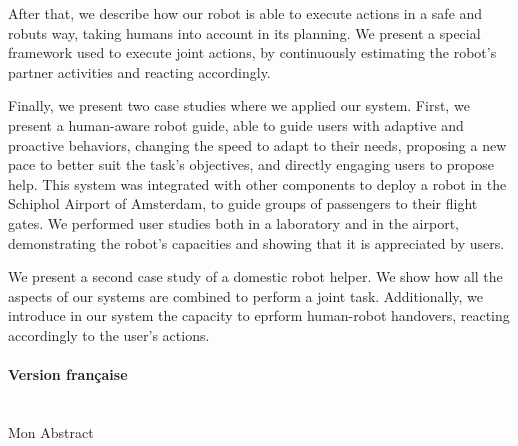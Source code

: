 \documentclass[11pt, oneside]{Thesis} %
\begin{document}
{After that, we describe how our robot is able to execute actions in a safe and robuts way, taking humans into account in its planning. We present a special framework used to execute joint actions, by continuously estimating the robot's partner activities and reacting accordingly.

Finally, we present two case studies where we applied our system. First, we present a human-aware robot guide, able to guide users with adaptive and proactive behaviors, changing the speed to adapt to their needs, proposing a new pace to better suit the task's objectives, and directly engaging users to propose help. This system was integrated with other components to deploy a robot in the Schiphol Airport of Amsterdam, to guide groups of passengers to their flight gates. We performed user studies both in a laboratory and in the airport, demonstrating the robot's capacities and showing that it is appreciated by users. 

We present a second case study of a domestic robot helper. We show how all the aspects of our systems are combined to perform a joint task. Additionally, we introduce in our system the capacity to eprform human-robot handovers, reacting accordingly to the user's actions.

\paragraph{Version fran\c caise}
~\\
Mon Abstract
}

\clearpage %



\clearpage %


\pagestyle{fancy} %
\end{document}
